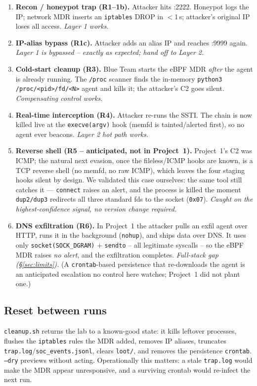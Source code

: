 \documentclass[11pt]{article}
\newcommand{\co}[1]{\texttt{#1}}
\begin{document}
\begin{enumerate}[leftmargin=1.4em]
  \item \textbf{Recon / honeypot trap (R1--1b).} Attacker hits :2222.
        Honeypot logs the IP; network MDR inserts an \co{iptables} DROP in
        $<$1\,s; attacker's original IP loses all access. \emph{Layer 1 works.}
  \item \textbf{IP-alias bypass (R1c).} Attacker adds an alias IP and reaches
        :9999 again. \emph{Layer 1 is bypassed -- exactly as expected; hand
        off to Layer 2.}
  \item \textbf{Cold-start cleanup (R3).} Blue Team starts the eBPF MDR
        \emph{after} the agent is already running. The \co{/proc} scanner
        finds the in-memory \co{python3 /proc/<pid>/fd/<N>} agent and kills
        it; the attacker's C2 goes silent. \emph{Compensating control works.}
  \item \textbf{Real-time interception (R4).} Attacker re-runs the SSTI. The
        chain is now killed live at the \co{execve(argv)} hook (memfd is
        tainted/alerted first), so no agent ever beacons. \emph{Layer 2 hot
        path works.}
  \item \textbf{Reverse shell (R5 -- anticipated, not in Project~1).}
        Project~1's C2 was ICMP; the natural next evasion, once the
        fileless/ICMP hooks are known, is a TCP reverse shell (no memfd, no
        raw ICMP), which leaves the four staging hooks silent by design. We
        validated this case ourselves: the same tool still catches it ---
        \co{connect} raises an alert, and the process is killed the moment
        \co{dup2/dup3} redirects all three standard fds to the socket
        (\co{0x07}). \emph{Caught on the highest-confidence signal, no version
        change required.}
  \item \textbf{DNS exfiltration (R6).} In Project~1 the attacker pulls an
        exfil agent over HTTP, runs it in the background (\co{nohup}), and
        ships data over DNS. It uses only \co{socket(SOCK\_DGRAM)} +
        \co{sendto} -- all legitimate syscalls -- so the eBPF MDR raises
        \emph{no alert}, and the exfiltration completes. \emph{Full-stack gap
        (\S\ref{sec:limits}).} (A \co{crontab}-based persistence that
        re-downloads the agent is an anticipated escalation no control here
        watches; Project~1 did not plant one.)
\end{enumerate}

\subsection{Reset between runs}
\co{cleanup.sh} returns the lab to a known-good state: it kills leftover
processes, flushes the \co{iptables} rules the MDR added, removes IP
aliases, truncates \co{trap.log}/\co{soc\_events.jsonl}, clears \co{loot/},
and removes the persistence \co{crontab}. \co{--dry} previews without acting.
Operationally this matters: a stale \co{trap.log} would make the MDR appear
unresponsive, and a surviving crontab would re-infect the next run.
\end{document}
